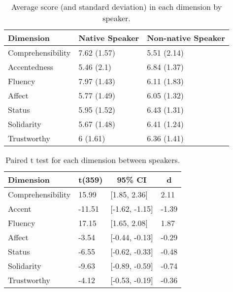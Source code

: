 \documentclass[
  man,floatsintext]{apa7}
\begin{document}
\begin{table}[tbp]

\begin{center}
\begin{threeparttable}

\caption{\label{tab:tab5}Average score (and standard deviation) in each dimension by speaker.}

\begin{tabular}{lll}
\toprule
Dimension & \multicolumn{1}{c}{Native Speaker} & \multicolumn{1}{c}{Non-native Speaker}\\
\midrule
Comprehensibility & 7.62 (1.57) & 5.51 (2.14)\\
Accentedness & 5.46 (2.1) & 6.84 (1.37)\\
Fluency & 7.97 (1.43) & 6.11 (1.83)\\
Affect & 5.77 (1.49) & 6.05 (1.32)\\
Status & 5.95 (1.52) & 6.43 (1.31)\\
Solidarity & 5.67 (1.48) & 6.41 (1.24)\\
Trustworthy & 6 (1.61) & 6.36 (1.41)\\
\bottomrule
\end{tabular}

\end{threeparttable}
\end{center}

\end{table}

\begin{table}[tbp]

\begin{center}
\begin{threeparttable}

\caption{\label{tab:tab6}Paired t test for each dimension between speakers.}

\begin{tabular}{llll}
\toprule
Dimension & \multicolumn{1}{c}{t(359)} & \multicolumn{1}{c}{95\% CI} & \multicolumn{1}{c}{d}\\
\midrule
Comprehensibility & 15.99 & {}[1.85, 2.36] & 2.11\\
Accent & -11.51 & {}[-1.62, -1.15] & -1.39\\
Fluency & 17.15 & {}[1.65, 2.08] & 1.87\\
Affect & -3.54 & {}[-0.44, -0.13] & -0.29\\
Status & -6.55 & {}[-0.62, -0.33] & -0.48\\
Solidarity & -9.63 & {}[-0.89, -0.59] & -0.74\\
Trustworthy & -4.12 & {}[-0.53, -0.19] & -0.36\\
\bottomrule
\end{tabular}

\end{threeparttable}
\end{center}

\end{table}
\end{document}
